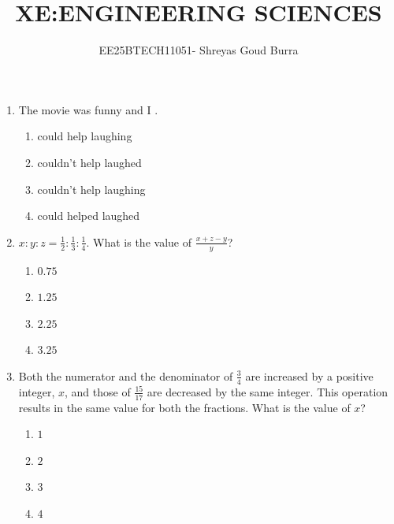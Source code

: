 \documentclass[a4paper,10pt]{article}
\title{XE:ENGINEERING SCIENCES}
\author{EE25BTECH11051- Shreyas Goud Burra}
\date{}
\begin{document}
\maketitle

\begin{enumerate}

\item The movie was funny and I \underline{\hspace{2cm}}.

\hfill{}
\begin{enumerate}
	\item could help laughing
	\item couldn't help laughed
	\item couldn't help laughing
	\item could helped laughed
\end{enumerate}

\item $x \colon y \colon z = \frac{1}{2} \colon \frac{1}{3} \colon \frac{1}{4}$.
What is the value of $\frac{x+z-y}{y}$?

\hfill{}
\begin{enumerate}
	\item $0.75$
	\item $1.25$
	\item $2.25$
	\item $3.25$
\end{enumerate}

\item Both the numerator and the denominator of $\frac{3}{4}$ are increased by a positive integer, $x$, and those of $\frac{15}{17}$ are decreased by the same integer. This operation results in the same value for both the fractions.
What is the value of $x$?

\hfill{}
\begin{enumerate}
	\item $1$
	\item $2$
	\item $3$
	\item $4$
\end{enumerate}


\end{enumerate}
\end{document}
